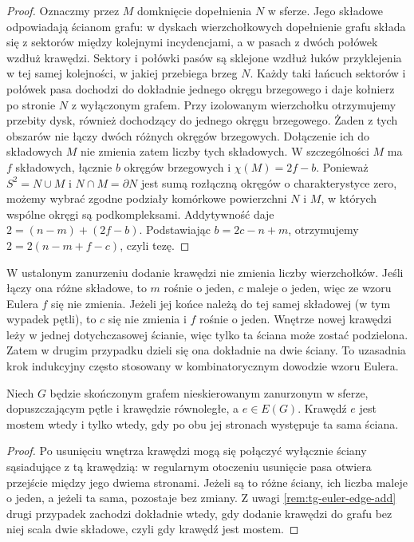 \begin{proof}
Oznaczmy przez $M$ domknięcie dopełnienia $N$ w sferze.
Jego składowe odpowiadają ścianom grafu: w dyskach
wierzchołkowych dopełnienie grafu składa się z sektorów
między kolejnymi incydencjami, a w pasach z dwóch
połówek wzdłuż krawędzi. Sektory i połówki pasów są sklejone wzdłuż łuków
przyklejenia w tej samej kolejności, w jakiej przebiega
brzeg $N$. Każdy taki łańcuch sektorów i połówek pasa
dochodzi do dokładnie jednego okręgu brzegowego i daje
kołnierz po stronie $N$ z wyłączonym grafem.
Przy izolowanym wierzchołku otrzymujemy przebity dysk,
również dochodzący do jednego okręgu brzegowego.
Żaden z tych obszarów nie łączy dwóch różnych
okręgów brzegowych. Dołączenie ich do składowych $M$
nie zmienia zatem liczby tych składowych.
W szczególności $M$ ma $f$ składowych, łącznie $b$
okręgów brzegowych i $\chi(M)=2f-b$.
Ponieważ $S^2=N\cup M$ i $N\cap M=\partial N$
jest sumą rozłączną okręgów o charakterystyce zero,
możemy wybrać zgodne podziały komórkowe powierzchni
$N$ i $M$, w których wspólne okręgi są podkompleksami.
Addytywność daje $2=(n-m)+(2f-b)$.
Podstawiając $b=2c-n+m$, otrzymujemy
$2=2(n-m+f-c)$, czyli tezę.
\end{proof}

\begin{uwaga}
\label{rem:tg-euler-edge-add}
W ustalonym zanurzeniu dodanie krawędzi nie zmienia
liczby wierzchołków. Jeśli łączy ona różne składowe,
to $m$ rośnie o jeden, $c$ maleje o jeden, więc
ze wzoru Eulera $f$ się nie zmienia. Jeżeli jej końce
należą do tej samej składowej (w tym wypadek pętli),
to $c$ się nie zmienia i $f$ rośnie o jeden.
Wnętrze nowej krawędzi leży w jednej dotychczasowej
ścianie, więc tylko ta ściana może zostać podzielona.
Zatem w drugim przypadku dzieli się ona dokładnie na
dwie ściany. To uzasadnia krok indukcyjny często
stosowany w kombinatorycznym dowodzie wzoru Eulera.
\end{uwaga}


\begin{wniosek}
\label{cor:tg-bridge-face}
Niech $G$ będzie skończonym grafem nieskierowanym
zanurzonym w sferze, dopuszczającym pętle i krawędzie
równoległe, a $e\in E(G)$. Krawędź $e$ jest mostem
wtedy i tylko wtedy, gdy po obu jej stronach
występuje ta sama ściana.
\end{wniosek}
\begin{proof}
Po usunięciu wnętrza krawędzi mogą się połączyć
wyłącznie ściany sąsiadujące z tą krawędzią:
w regularnym otoczeniu usunięcie pasa otwiera
przejście między jego dwiema stronami.
Jeżeli są to różne ściany, ich liczba maleje o jeden,
a jeżeli ta sama, pozostaje bez zmiany. Z uwagi
\ref{rem:tg-euler-edge-add} drugi przypadek zachodzi
dokładnie wtedy, gdy dodanie krawędzi do grafu bez niej
scala dwie składowe, czyli gdy krawędź jest mostem.
\end{proof}

